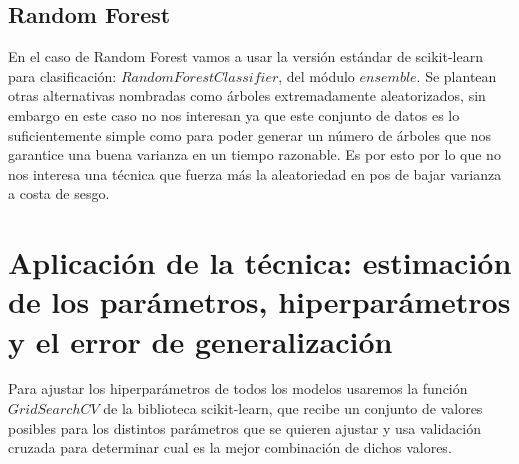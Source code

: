 \documentclass{article}
\begin{document}
	\subsection{Random Forest}
	En el caso de Random Forest vamos a usar la versión estándar de scikit-learn para clasificación: $RandomForestClassifier$, del módulo $ensemble$. Se plantean otras alternativas nombradas como árboles extremadamente aleatorizados, sin embargo en este caso no nos interesan ya que este conjunto de datos es lo suficientemente simple como para poder generar un número de árboles que nos garantice una buena varianza en un tiempo razonable. Es por esto por lo que no nos interesa una técnica que fuerza más la aleatoriedad en pos de bajar varianza a costa de sesgo.
	
	\section{Aplicación de la técnica: estimación de los parámetros, hiperparámetros y el error de generalización}
	
	Para ajustar los hiperparámetros de todos los modelos usaremos la función $GridSearchCV$ de la biblioteca scikit-learn, que recibe un conjunto de valores posibles para los distintos parámetros que se quieren ajustar y usa validación cruzada para determinar cual es la mejor combinación de dichos valores.
\end{document}
